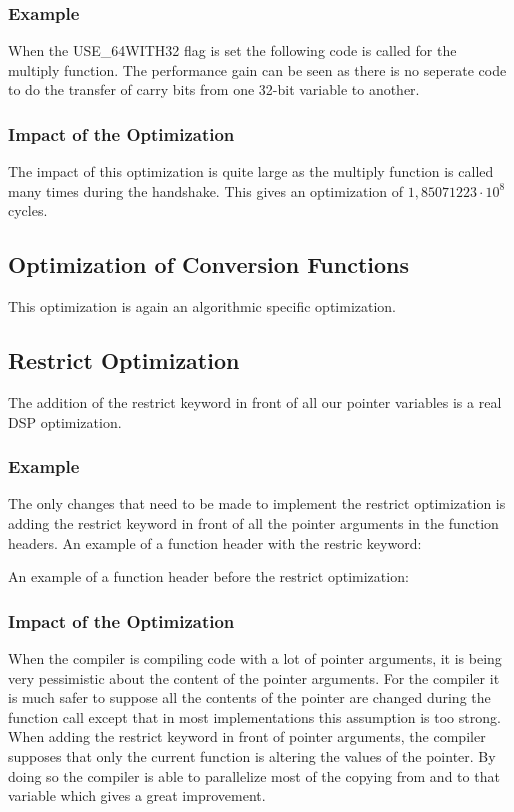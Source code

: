 \documentclass[a4paper]{article}
\begin{document}
	\subsubsection{Example}
		When the USE\_64WITH32 flag is set the following code is called for the multiply function. The performance gain can be seen as there is no seperate code to do the transfer of carry bits from one 32-bit variable to another.
		
	\subsubsection{Impact of the Optimization}
		The impact of this optimization is quite large as the multiply function is called many times during the handshake. This gives an optimization of $1,85071223\cdot10^{8}$ cycles.
\subsection{Optimization of Conversion Functions}
	This optimization is again an algorithmic specific optimization. 
\subsection{Restrict Optimization}
	The addition of the restrict keyword in front of all our pointer variables is a real DSP optimization.
	\subsubsection{Example}
		The only changes that need to be made to implement the restrict optimization is adding the restrict keyword in front of all the pointer arguments in the function headers. An example of a function header with the restric keyword:
		
		An example of a function header before the restrict optimization:
		
	\subsubsection{Impact of the Optimization}
	When the compiler is compiling code with a lot of pointer arguments, it is being very pessimistic about the content of the pointer arguments. For the compiler it is much safer to suppose all the contents of the pointer are changed during the function call except that in most implementations this assumption is too strong. When adding the restrict keyword in front of pointer arguments, the compiler supposes that only the current function is altering the values of the pointer. By doing so the compiler is able to parallelize most of the copying from and to that variable which gives a great improvement.\\
	
\end{document}
